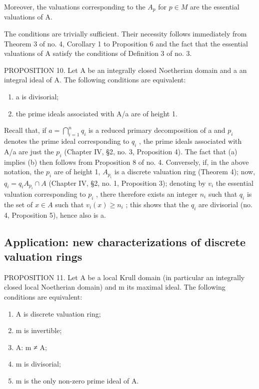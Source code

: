Moreover, the valuations corresponding to the \(A_{p}\) for \(p \in M\) are the essential valuations of A.

The conditions are trivially sufficient. Their necessity follows immediately from Theorem 3 of no. 4, Corollary 1 to Proposition 6 and the fact that the essential valuations of A satisfy the conditions of Definition 3 of no. 3.

PROPOSITION 10. Let A be an integrally closed Noetherian domain and a an integral ideal of A. The following conditions are equivalent:

\begin{enumerate}
\def\labelenumi{(\alph{enumi})}
\item
  a is divisorial;
\item
  the prime ideals associated with A/a are of height 1.
\end{enumerate}

Recall that, if \(a = \bigcap_{i=1}^{n} q_i\) is a reduced primary decomposition of a and \(p_i\) denotes the prime ideal corresponding to \(q_i\) , the prime ideals associated with A/a are just the \(p_i\) (Chapter IV, §2, no. 3, Proposition 4). The fact that (a) implies (b) then follows from Proposition 8 of no. 4. Conversely, if, in the above notation, the \(p_i\) are of height 1, \(A_{p_i}\) is a discrete valuation ring (Theorem 4); now, \(q_i = q_i A_{p_i} \cap A\) (Chapter IV, §2, no. 1, Proposition 3); denoting by \(v_i\) the essential valuation corresponding to \(p_i\) , there therefore exists an integer \(n_i\) such that \(q_i\) is the set of \(x \in A\) such that \(v_i(x) \geqslant n_i\) ; this shows that the \(q_i\) are divisorial (no. 4, Proposition 5), hence also is a.

\subsection{Application: new characterizations of discrete valuation rings}

PROPOSITION 11. Let A be a local Krull domain (in particular an integrally closed local Noetherian domain) and m its maximal ideal. The following conditions are equivalent:

\begin{enumerate}
\def\labelenumi{(\alph{enumi})}
\item
  A is discrete valuation ring;
\item
  m is invertible;
\item
  A: m ≠ A;
\item
  m is divisorial;
\item
  m is the only non-zero prime ideal of A.
\end{enumerate}

